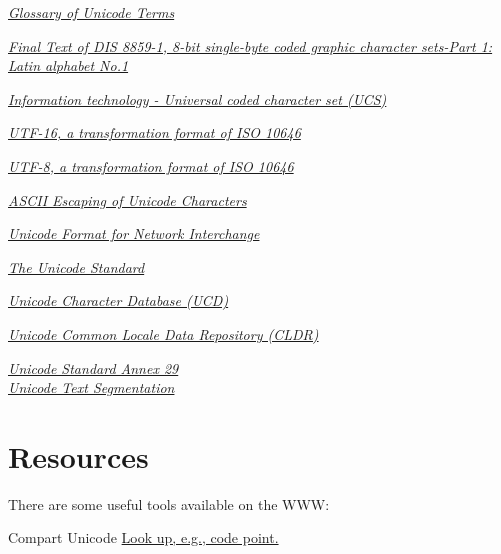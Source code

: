\documentclass[b4paper]{article}
\begin{document}
\begin{thebibliography}{9}
\href{https://unicode.org/glossary/}%
{\textit{Glossary of Unicode Terms}}

\href{https://www.open-std.org/JTC1/sc2/wg3/docs/n411.pdf}%
{\textit{Final Text of DIS 8859-1, 8-bit single-byte coded graphic character sets-Part 1: Latin alphabet No.1}}

\href{https://www.iso.org/standard/76835.html}%
{\textit{Information technology - Universal coded character set (UCS)}}

\href{https://datatracker.ietf.org/doc/rfc2781/}%
{\textit{UTF-16, a transformation format of ISO 10646}}

\href{https://datatracker.ietf.org/doc/rfc3629/}%
{\textit{UTF-8, a transformation format of ISO 10646}}

\href{https://datatracker.ietf.org/doc/rfc5137/}%
{\textit{ASCII Escaping of Unicode Characters}}

\href{https://datatracker.ietf.org/doc/rfc5198/}%
{\textit{Unicode Format for Network Interchange}}

\href{https://www.unicode.org/standard/standard.html}%
{\textit{The Unicode Standard}}

\href{https://www.unicode.org/ucd/}%
{\textit{Unicode Character Database (UCD)}}

\href{https://cldr.unicode.org/}%
{\textit{Unicode Common Locale Data Repository (CLDR)}}

\href{https://www.unicode.org/reports/tr29/}%
{\textit{Unicode{\textregistered} Standard Annex 29\\ %
Unicode Text Segmentation}}

\end{thebibliography}

\section{Resources}
There are some useful tools available on the WWW:

\begin{resource}
\item[Compart Unicode]%
\href{https://www.compart.com/en/unicode/}%
{Look up, e.g., code point.}
\end{resource}
\end{document}
